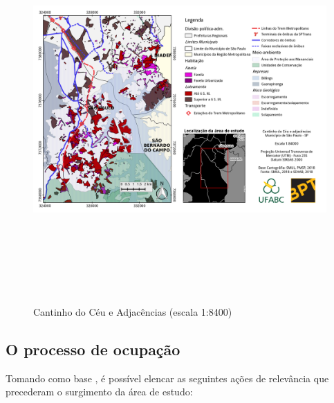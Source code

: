 	\begin{landscape}
		\begin{figure}
			\centering
			\caption{Cantinho do Céu e Adjacências (escala 1:8400)}
			\includegraphics[height=14cm,keepaspectratio]{img/mapa_1-84000}
			\label{fig:mapa_1-84000}
		\end{figure}
	\end{landscape}
	
	\subsection{O processo de ocupação} \label{ocupacao}
	
	Tomando como base , é possível elencar as seguintes ações de relevância que precederam o surgimento da área de estudo:
	
